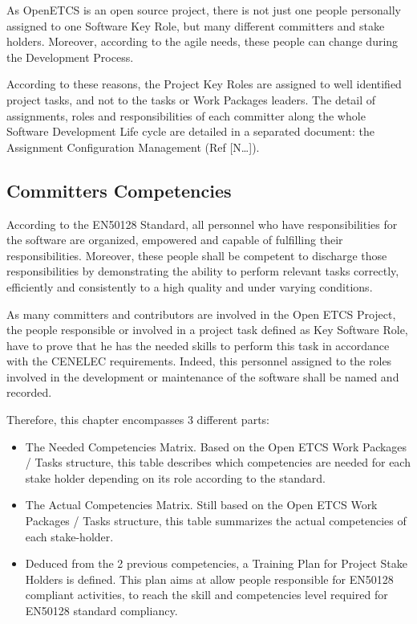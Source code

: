 \documentclass{template/openetcs_article}
\begin{document}
As OpenETCS is an open source project, there is not just one people personally assigned to one Software Key Role, but many different committers and stake holders. Moreover, according to the agile needs, these people can change during the Development Process.

According to these reasons, the Project Key Roles are assigned to well identified project tasks, and not to the tasks or Work Packages leaders. The detail of assignments, roles and responsibilities of each committer along the whole Software Development Life cycle are detailed in a separated document: the Assignment Configuration Management (Ref [N{\dots}]).

\subsection{Committers Competencies}

According to the EN50128 Standard, all personnel who have responsibilities for the software are organized, empowered and capable of fulfilling their responsibilities. Moreover, these people shall be competent to discharge those responsibilities by demonstrating the ability to perform relevant tasks correctly, efficiently and consistently to a high quality and under varying conditions.

As many committers and contributors are involved in the Open ETCS Project, the people responsible or involved in a project task defined as Key Software Role, have to prove that he has the needed skills to perform this task in accordance with the CENELEC requirements. Indeed, this personnel assigned to the roles involved in the development or maintenance of the software shall be named and recorded.

Therefore, this chapter encompasses 3 different parts:
\begin{itemize}
\item The Needed Competencies Matrix. Based on the Open ETCS Work Packages / Tasks structure, this table describes which competencies are needed for each stake holder depending on its role according to the standard.
\item The Actual Competencies Matrix. Still based on the Open ETCS Work Packages / Tasks structure, this table summarizes the actual competencies of each stake-holder.
\item Deduced from the 2 previous competencies, a Training Plan for Project Stake Holders is defined. This plan aims at allow people responsible for EN50128 compliant activities, to reach the skill and competencies level required for EN50128 standard compliancy.
\end{itemize}
\end{document}
